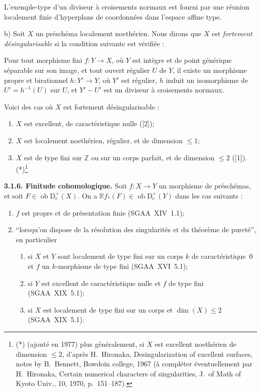 \documentclass[11pt]{article}
\newcommand{\R}{\mathbb{R}}\newcommand{\RHomCore}{\mathbb{R}\mathrm{Hom}}
\newcommand{\D}{\mathrm{D}}
\newcommand{\Z}{\mathbb{Z}}
\newcommand{\ob}{\operatorname{ob}}
\providecommand{\ob}{\operatorname{ob}}
\providecommand{\R}{\mathrm R}
\providecommand{\Z}{\mathbb Z}
\begin{document}
L'exemple-type d'un diviseur à croisements normaux est fourni par une réunion localement finie d'hyperplans de coordonnées dans l'espace affine type.

b) Soit $X$ un préschéma localement noethérien. Nous dirons que $X$ est \emph{fortement désingularisable} si la condition suivante est vérifiée :

Pour tout morphisme fini $f : Y \to X$, où $Y$ est intègre et de point générique séparable sur son image, et tout ouvert régulier $U$ de $Y$, il existe un morphisme propre et birationnel $h : Y' \to Y$, où $Y'$ est régulier, $h$ induit un isomorphisme de $U' = h^{-1}(U)$ sur $U$, et $Y' - U'$ est un diviseur à croisements normaux.

Voici des cas où $X$ est fortement désingularisable :
\begin{enumerate}
\item[a)] $X$ est excellent, de caractéristique nulle ([2]);
\item[b)] $X$ est localement noethérien, régulier, et de dimension $\leqslant 1$;
\item[c)] $X$ est de type fini sur $\Z$ ou sur un corps parfait, et de dimension $\leqslant 2$ ([1]).(*)\footnote{(*) (ajouté en 1977) plus généralement, si $X$ est excellent noethérien de dimension $\leqslant 2$, d'après H.~Hironaka, Desingularization of excellent surfaces, notes by B.~Bennett, Bowdoin college, 1967 (à compléter éventuellement par H.~Hironaka, Certain numerical characters of singularities, J.~of Math of Kyoto Univ., 10, 1970, p.~151--187).}
\end{enumerate}

\textbf{3.1.6. Finitude cohomologique.} Soit $f : X \to Y$ un morphisme de préschémas, et soit $F \in \ob \D_c^{+}(X)$. On a $\R f_{*}(F) \in \ob \D_c^{+}(Y)$ dans les cas suivants :
\begin{enumerate}
\item[a)] $f$ est propre et de présentation finie (SGAA~XIV~1.1);
\item[b)] ``lorsqu'on dispose de la résolution des singularités et du théorème de pureté'', en particulier
\begin{enumerate}
\item[(i)] si $X$ et $Y$ sont localement de type fini sur un corps $k$ de caractéristique~0 et $f$ un $k$-morphisme de type fini (SGAA~XVI~5.1);
\item[(ii)] si $Y$ est excellent de caractéristique nulle et $f$ de type fini (SGAA~XIX~5.1);
\item[(iii)] si $X$ est localement de type fini sur un corps et $\dim(X) \leqslant 2$ (SGAA~XIX~5.1).
\end{enumerate}
\end{enumerate}
\end{document}
